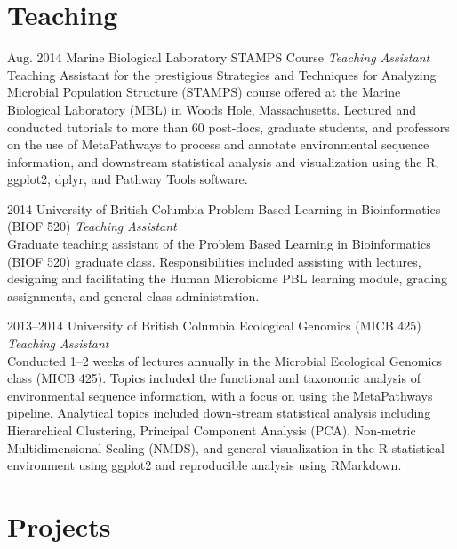 \documentclass[print]{hanson_cv} %
\begin{document}
\section{Teaching}

\begin{entrylist}
\entry
{Aug. 2014}
{Marine Biological Laboratory}
{STAMPS Course}
{\emph{Teaching Assistant} \\
Teaching Assistant for the prestigious Strategies and Techniques for Analyzing Microbial Population Structure (STAMPS) course offered at the Marine Biological Laboratory (MBL) in Woods Hole, Massachusetts. Lectured and conducted tutorials to more than 60 post-docs, graduate students, and professors on the use of MetaPathways to process and annotate environmental sequence information, and downstream statistical analysis and visualization using the R, ggplot2, dplyr, and Pathway Tools software.}
\end{entrylist}
\begin{entrylist}
\entry
{2014}
{University of British Columbia}
{Problem Based Learning in Bioinformatics (BIOF 520)}
{\emph{Teaching Assistant} \\
Graduate teaching assistant of the Problem Based Learning in Bioinformatics (BIOF 520) graduate class. Responsibilities included assisting with lectures, designing and facilitating the Human Microbiome PBL learning module, grading assignments, and general class administration.}
\end{entrylist}
\begin{entrylist}
\entry
{2013--2014}
{University of British Columbia}
{Ecological Genomics (MICB 425)}
{\emph{Teaching Assistant} \\
Conducted 1--2 weeks of lectures annually in the Microbial
  Ecological Genomics class (MICB 425). Topics included the
  functional and taxonomic analysis of environmental sequence
  information, with a focus on using the MetaPathways pipeline. Analytical topics
  included down-stream statistical analysis including Hierarchical
  Clustering, Principal Component Analysis (PCA), Non-metric
  Multidimensional Scaling (NMDS), and general visualization in the R
  statistical environment using ggplot2 and reproducible analysis using RMarkdown.}
\end{entrylist}

\section{Projects}
\end{document}
